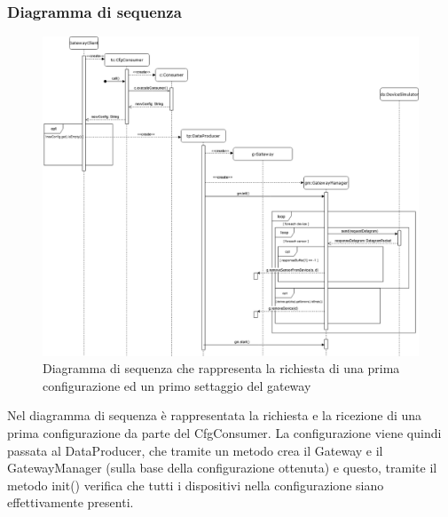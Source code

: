 	\begin{landscape}
		\subsubsection{Diagramma di sequenza}%
		  	\begin{figure}[H]
				\centering
				\includegraphics[scale=0.360]{res/images/GATEWAY/RichiestaInvioGateway.png}
				\caption{Diagramma di sequenza che rappresenta la richiesta di una prima configurazione ed un primo settaggio del gateway}
				\label{Diagramma 3}
			\end{figure}
			Nel diagramma di sequenza è rappresentata la richiesta e la ricezione di una prima configurazione da parte del CfgConsumer.
			\newline
			La configurazione viene quindi passata al DataProducer, che tramite un metodo crea il Gateway e il GatewayManager (sulla base della configurazione ottenuta) e questo, tramite il metodo init() verifica che tutti i dispositivi nella configurazione siano effettivamente presenti.
	\end{landscape}
	
